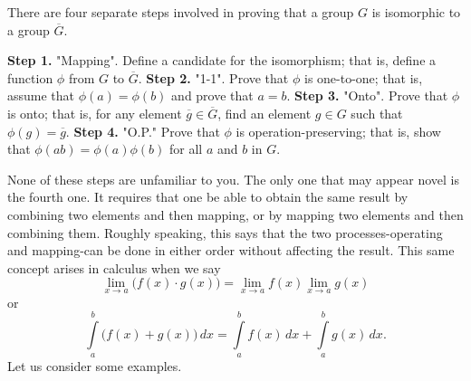 \documentclass[12pt]{article}
\begin{document}
	There are four separate steps involved in proving that a group $G$ is isomorphic to a group $\overline{G}$.\newline
	
	\textbf{Step 1.} "Mapping". Define a candidate for the isomorphism; that is, define a function $\phi$ from $G$ to $\overline{G}$.\newline
	\textbf{Step 2.} "1-1". Prove that $\phi$ is one-to-one; that is, assume that $\phi(a) = \phi(b)$ and prove that $a = b$.\newline
	\textbf{Step 3.} "Onto". Prove that $\phi$ is onto; that is, for any element $\overline{g} \in \overline{G}$, find an element $g \in G$ such that $\phi(g) = \overline{g}$.
	\textbf{Step 4.} "O.P." Prove that $\phi$ is operation-preserving; that is, show that $\phi(ab) = \phi(a)\phi(b)$ for all $a$ and $b$ in $G$.\newline
	
	None of these steps are unfamiliar to you. The only one that may appear novel is the fourth one. It requires that one be able to obtain the same result by combining two elements and then mapping, or by mapping two elements and then combining them. Roughly speaking, this says that the two processes-operating and mapping-can be done in either order without affecting the result. This same concept arises in calculus when we say
	\[
		\lim_{x \to a} \big( f(x) \cdot g(x) \big) = \lim_{x \to a} f(x) \lim_{x \to a} g(x)
	\]
	or
	\[
		\int\limits_a^b \big( f(x) + g(x) \big) \, dx = \int\limits_a^b f(x) \, dx + \int\limits_a^b g(x) \, dx.
	\]
	Let us consider some examples.\newline
	
\end{document}
